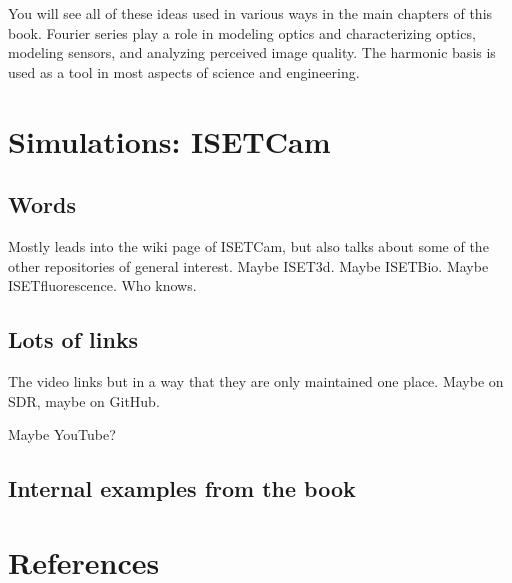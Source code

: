 \documentclass[
  letterpaper,
]{book}
\begin{document}
You will see all of these ideas used in various ways in the main
chapters of this book. Fourier series play a role in modeling optics and
characterizing optics, modeling sensors, and analyzing perceived image
quality. The harmonic basis is used as a tool in most aspects of science
and engineering.

\chapter{Simulations: ISETCam}\label{sec-isetcam}

\section{Words}\label{words}

Mostly leads into the wiki page of ISETCam, but also talks about some of
the other repositories of general interest. Maybe ISET3d. Maybe ISETBio.
Maybe ISETfluorescence. Who knows.

\section{Lots of links}\label{lots-of-links}

The video links but in a way that they are only maintained one place.
Maybe on SDR, maybe on GitHub.

Maybe YouTube?

\section{Internal examples from the
book}\label{internal-examples-from-the-book}


\chapter*{References}\label{references-1}

\end{document}
